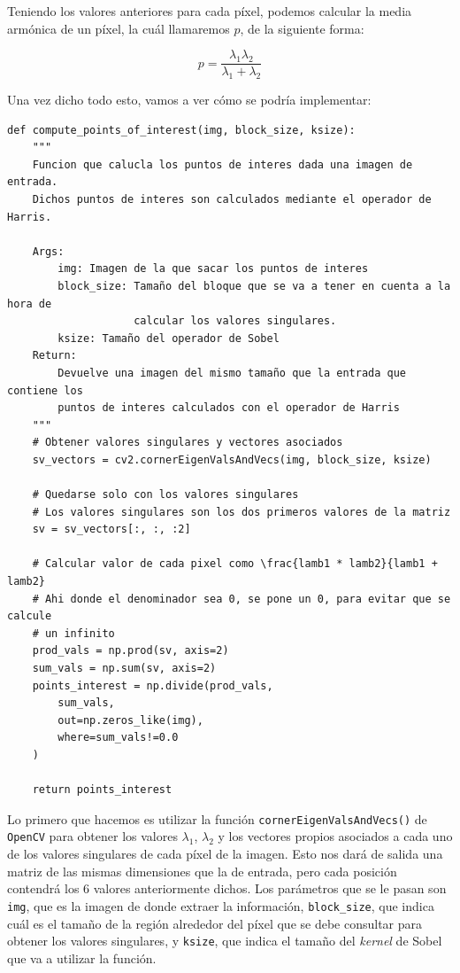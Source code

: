 \documentclass[11pt,a4paper]{article}
\begin{document}
Teniendo los valores anteriores para cada píxel, podemos calcular la media armónica
de un píxel, la cuál llamaremos $p$, de la siguiente forma:

\begin{equation}
	p	= \frac{\lambda_1 \lambda_2}{\lambda_1 + \lambda_2}
\end{equation}

Una vez dicho todo esto, vamos a ver cómo se podría implementar:

\begin{lstlisting}
def compute_points_of_interest(img, block_size, ksize):
    """
    Funcion que calucla los puntos de interes dada una imagen de entrada.
    Dichos puntos de interes son calculados mediante el operador de Harris.
    
    Args:
        img: Imagen de la que sacar los puntos de interes
        block_size: Tamaño del bloque que se va a tener en cuenta a la hora de
                    calcular los valores singulares.
        ksize: Tamaño del operador de Sobel
    Return:
        Devuelve una imagen del mismo tamaño que la entrada que contiene los
        puntos de interes calculados con el operador de Harris
    """
    # Obtener valores singulares y vectores asociados
    sv_vectors = cv2.cornerEigenValsAndVecs(img, block_size, ksize)

    # Quedarse solo con los valores singulares
    # Los valores singulares son los dos primeros valores de la matriz
    sv = sv_vectors[:, :, :2]

    # Calcular valor de cada pixel como \frac{lamb1 * lamb2}{lamb1 + lamb2}
    # Ahi donde el denominador sea 0, se pone un 0, para evitar que se calcule
    # un infinito
    prod_vals = np.prod(sv, axis=2)
    sum_vals = np.sum(sv, axis=2)
    points_interest = np.divide(prod_vals, 
        sum_vals,
        out=np.zeros_like(img),
        where=sum_vals!=0.0
    )

    return points_interest
\end{lstlisting}

Lo primero que hacemos es utilizar la función \texttt{cornerEigenValsAndVecs()} de
\texttt{OpenCV} para obtener los valores $\lambda_1$, $\lambda_2$ y los vectores
propios asociados a cada uno de los valores singulares de cada píxel de la imagen. Esto
nos dará de salida una matriz de las mismas dimensiones que la de entrada, pero
cada posición contendrá los 6 valores anteriormente dichos. Los parámetros que se
le pasan son \texttt{img}, que es la imagen de donde extraer la información,
\texttt{block\_size}, que indica cuál es el tamaño de la región alrededor del píxel
que se debe consultar para obtener los valores singulares, y \texttt{ksize}, que indica
el tamaño del \textit{kernel} de Sobel que va a utilizar la función.
\end{document}

